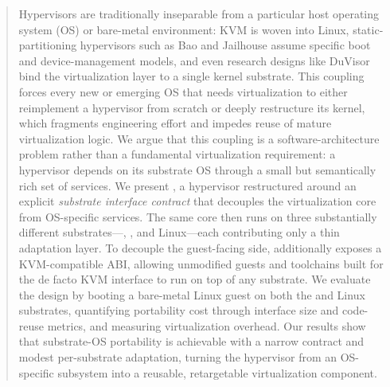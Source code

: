 \begin{abstract}
Hypervisors are traditionally inseparable from a particular host operating
system (OS) or bare-metal environment: KVM is woven into Linux,
static-partitioning hypervisors such as Bao and Jailhouse assume specific boot
and device-management models, and even research designs like DuVisor bind the
virtualization layer to a single kernel substrate. This coupling forces every
new or emerging OS that needs virtualization to either reimplement a hypervisor
from scratch or deeply restructure its kernel, which fragments engineering
effort and impedes reuse of mature virtualization logic. We argue that this
coupling is a software-architecture problem rather than a fundamental
virtualization requirement: a hypervisor depends on its substrate OS through a
small but semantically rich set of services. We present \axvisor{}, a hypervisor
restructured around an explicit \emph{substrate interface contract} that
decouples the virtualization core from OS-specific services. The same
\axvisor{} core then runs on three substantially different
substrates---\arceos{}, \asterinas{}, and Linux---each contributing only a thin
adaptation layer. To decouple the guest-facing side, \axvisor{} additionally
exposes a KVM-compatible ABI, allowing unmodified guests and toolchains built
for the de facto KVM interface to run on top of any substrate. We evaluate the
design by booting a bare-metal Linux guest on both the \asterinas{} and Linux
substrates, quantifying portability cost through interface size and code-reuse
metrics, and measuring virtualization overhead. Our results show that
substrate-OS portability is achievable with a narrow contract and modest
per-substrate adaptation, turning the hypervisor from an OS-specific subsystem
into a reusable, retargetable virtualization component.
\end{abstract}
